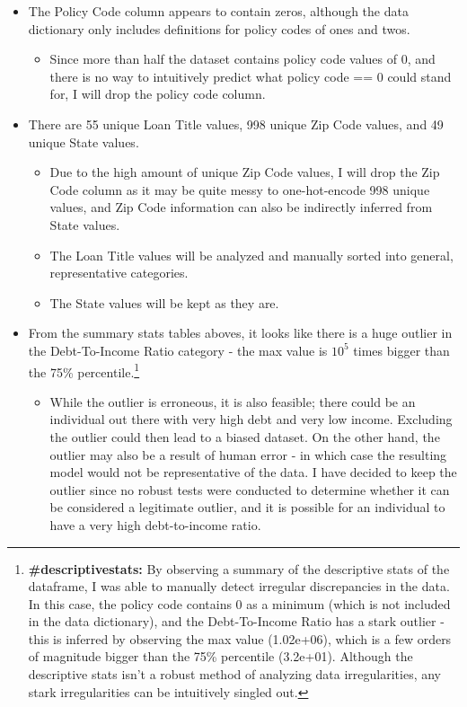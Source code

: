 \documentclass[11pt]{article}
\providecommand{\tightlist}{%
      \setlength{\itemsep}{0pt}\setlength{\parskip}{0pt}}
\begin{document}
\begin{itemize}
\tightlist
\item
  The Policy Code column appears to contain zeros, although the data
  dictionary only includes definitions for policy codes of ones and
  twos.

  \begin{itemize}
  \tightlist
  \item
    Since more than half the dataset contains policy code values of 0,
    and there is no way to intuitively predict what policy code == 0
    could stand for, I will drop the policy code column.
  \end{itemize}
\item
  There are 55 unique Loan Title values, 998 unique Zip Code values, and
  49 unique State values.

  \begin{itemize}
  \tightlist
  \item
    Due to the high amount of unique Zip Code values, I will drop the
    Zip Code column as it may be quite messy to one-hot-encode 998
    unique values, and Zip Code information can also be indirectly
    inferred from State values.
  \item
    The Loan Title values will be analyzed and manually sorted into
    general, representative categories.
  \item
    The State values will be kept as they are.
  \end{itemize}
\item
  From the summary stats tables aboves, it looks like there is a huge
  outlier in the Debt-To-Income Ratio category - the max value is
  \(10^5\) times bigger than the 75\% percentile.\footnote{\textbf{\#descriptivestats:} By observing a summary of the descriptive stats of the dataframe, I was able to manually detect irregular discrepancies in the data. In this case, the policy code contains 0 as a minimum (which is not included in the data dictionary), and the Debt-To-Income Ratio has a stark outlier - this is inferred by observing the max value (1.02e+06), which is a few orders of magnitude bigger than the 75\% percentile (3.2e+01). Although the descriptive stats isn't a robust method of analyzing data irregularities, any stark irregularities can be intuitively singled out. }

  \begin{itemize}
  \tightlist
  \item
    While the outlier is erroneous, it is also feasible; there could be
    an individual out there with very high debt and very low income.
    Excluding the outlier could then lead to a biased dataset. On the
    other hand, the outlier may also be a result of human error - in
    which case the resulting model would not be representative of the
    data. I have decided to keep the outlier since no robust tests were
    conducted to determine whether it can be considered a legitimate
    outlier, and it is possible for an individual to have a very high
    debt-to-income ratio.
  \end{itemize}
\end{itemize}
\end{document}
